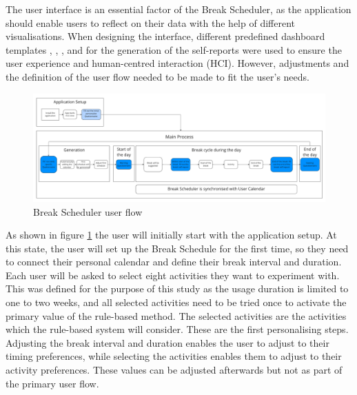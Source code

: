 \documentclass{hasel_thesis}
\begin{document}

The user interface is an essential factor of the Break Scheduler, as the application should enable users to reflect on their data with the help of different visualisations. When designing the interface, different predefined dashboard templates \cite{startAdmin}, \cite{codyhouse}, \cite{radiance}, and \cite{nicepage} for the generation of the self-reports 
were used to ensure the user experience and human-centred interaction (HCI). However, adjustments and the definition of the user flow needed to be made to fit the user's needs.

\begin{figure}[htp]
    \centering
    \includegraphics[width=15cm]{hasel_thesis/images/userflow_v2.png}
    \caption{Break Scheduler user flow}
    \label{fig:user-flow}
\end{figure}

As shown in figure \ref{fig:user-flow} the user will initially start with the application setup. At this state, the user will set up the Break Schedule for the first time, so they need to connect their personal calendar and define their break interval and duration. Each user will be asked to select eight activities they want to experiment with. This was defined for the purpose of this study as the usage duration is limited to one to two weeks, and all selected activities need to be tried once to activate the primary value of the rule-based method. The selected activities are the activities which the rule-based system will consider. These are the first personalising steps. Adjusting the break interval and duration enables the user to adjust to their timing preferences, while selecting the activities enables them to adjust to their activity preferences. These values can be adjusted afterwards but not as part of the primary user flow. 
\end{document}
